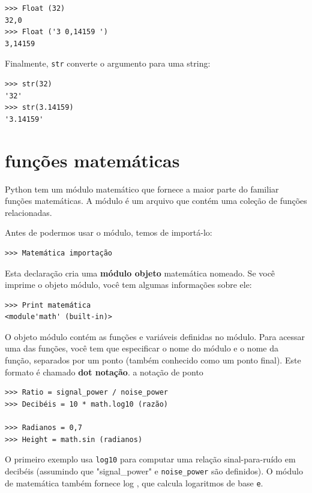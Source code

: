 \documentclass[10pt]{book}
\begin{document}
\begin{exercise}
\begin{verbatim}
>>> Float (32)
32,0
>>> Float ('3 0,14159 ')
3,14159
\end{verbatim}
%
Finalmente, {\tt str} converte o argumento para uma string:

\begin{verbatim}
>>> str(32)
'32'
>>> str(3.14159)
'3.14159'
\end{verbatim}
%



\section{funções matemáticas}

Python tem um módulo matemático que fornece a maior parte do familiar
funções matemáticas. A {módulo \bf} é um arquivo que contém uma
coleção de funções relacionadas.

Antes de podermos usar o módulo, temos de importá-lo:

\begin{verbatim}
>>> Matemática importação
\end{verbatim}
%
Esta declaração cria uma {\bf módulo objeto} matemática nomeado. Se
você imprime o objeto módulo, você tem algumas informações sobre ele:

\begin{verbatim}
>>> Print matemática
<module'math' (built-in)>
\end{verbatim}
%
O objeto módulo contém as funções e variáveis ​​definidas no
módulo. Para acessar uma das funções, você tem que especificar o nome
do módulo e o nome da função, separados por um ponto (também
conhecido como um ponto final). Este formato é chamado {\bf dot notação}.
\index{} a notação de ponto

\begin{verbatim}
>>> Ratio = signal_power / noise_power
>>> Decibéis = 10 * math.log10 (razão)

>>> Radianos = 0,7
>>> Height = math.sin (radianos)
\end{verbatim}
%
O primeiro exemplo usa \verb "log10" para computar 
uma relação sinal-para-ruído em decibéis (assumindo que \verbo "signal_power" e
\Verb "noise_power" são definidos). O módulo de matemática também fornece {log \tt},
que calcula logaritmos de base {\tt e}.


\end{exercise}
\end{document}
